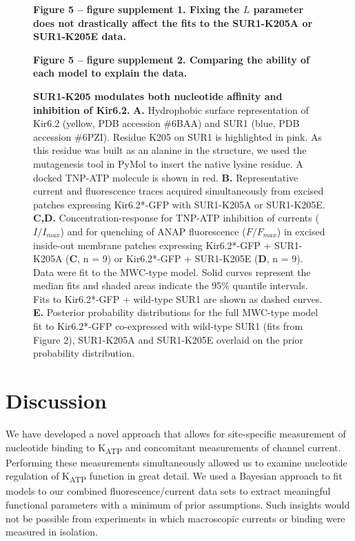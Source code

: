 \documentclass[10pt,lineno, doublespacing]{elife_modified}
\begin{document}
\begin{figure}\ContinuedFloat
\begin{fullwidth}
\caption{
\textbf{SUR1-K205 modulates both nucleotide affinity and inhibition of Kir6.2.}
\textbf{A.}
Hydrophobic surface representation of Kir6.2 (yellow, PDB accession \#6BAA) and SUR1 (blue, PDB accession \#6PZI).
Residue K205 on SUR1 is highlighted in pink.
As this residue was built as an alanine in the structure, we used the mutagenesis tool in PyMol to insert the native lysine residue.
A docked TNP-ATP molecule is shown in red.
\textbf{B.}
Representative current and fluorescence traces acquired simultaneously from excised patches expressing Kir6.2*-GFP with SUR1-K205A or SUR1-K205E.
\textbf{C,D.}
Concentration-response for TNP-ATP inhibition of currents ($I/I_{max}$) and for quenching of ANAP fluorescence ($F/F_{max}$) in excised inside-out membrane patches expressing Kir6.2*-GFP + SUR1-K205A (\textbf{C}, n = 9) or Kir6.2*-GFP + SUR1-K205E (\textbf{D}, n = 9).
Data were fit to the MWC-type model.
Solid curves represent the median fits and shaded areas indicate the 95\% quantile intervals.
Fits to Kir6.2*-GFP + wild-type SUR1 are shown as dashed curves.
\textbf{E.}
Posterior probability distributions for the full MWC-type model fit to Kir6.2*-GFP co-expressed with wild-type SUR1 (fits from Figure 2), SUR1-K205A and SUR1-K205E overlaid on the prior probability distribution.
}
\raggedright
\textbf{\small Figure 5 -- figure supplement 1. Fixing the $L$ parameter does not drastically affect the fits to the SUR1-K205A or SUR1-K205E data.}

\textbf{\small Figure 5 -- figure supplement 2. Comparing the ability of each model to explain the data. }
\end{fullwidth}
\end{figure}

\section{Discussion}

We have developed a novel approach that allows for site-specific measurement of nucleotide binding to K\textsubscript{ATP} and concomitant measurements of channel current.
Performing these measurements simultaneously allowed us to examine nucleotide regulation of K\textsubscript{ATP} function in great detail.
We used a Bayesian approach to fit models to our combined fluorescence/current data sets to extract meaningful functional parameters with a minimum of prior assumptions.
Such insights would not be possible from experiments in which macroscopic currents or binding were measured in isolation.
\end{document}
